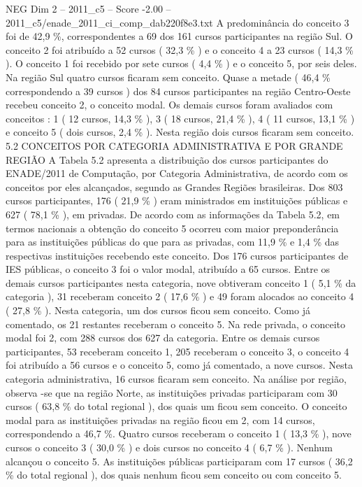 \begin{textsample}{NEG Dim 2 – 2011\_c5 – Score -2.00 – 2011\_c5/enade\_2011\_ci\_comp\_dab220f8e3.txt}
A predominância do conceito 3 foi de 42,9 \%, correspondentes a 69 dos 161 cursos participantes na região Sul.
O conceito 2 foi atribuído a 52 cursos ( 32,3 \% ) e o conceito 4 a 23 cursos ( 14,3 \% ).
O conceito 1 foi recebido por sete cursos ( 4,4 \% ) e o conceito 5, por seis deles.
Na região Sul quatro cursos ficaram sem conceito.
Quase a metade ( 46,4 \% correspondendo a 39 cursos ) dos 84 cursos participantes na região Centro-Oeste recebeu conceito 2, o conceito modal.
Os demais cursos foram avaliados com conceitos : 1 ( 12 cursos, 14,3 \% ), 3 ( 18 cursos, 21,4 \% ), 4 ( 11 cursos, 13,1 \% ) e conceito 5 ( dois cursos, 2,4 \% ).
Nesta região dois cursos ficaram sem conceito. 5.2 CONCEITOS POR CATEGORIA ADMINISTRATIVA E POR GRANDE REGIÃO A Tabela 5.2 apresenta a distribuição dos cursos participantes do ENADE/2011 de Computação, por Categoria Administrativa, de acordo com os conceitos por eles alcançados, segundo as Grandes Regiões brasileiras.
Dos 803 cursos participantes, 176 ( 21,9 \% ) eram ministrados em instituições públicas e 627 ( 78,1 \% ), em privadas.
De acordo com as informações da Tabela 5.2, em termos nacionais a obtenção do conceito 5 ocorreu com maior preponderância para as instituições públicas do que para as privadas, com 11,9 \% e 1,4 \% das respectivas instituições recebendo este conceito.
Dos 176 cursos participantes de IES públicas, o conceito 3 foi o valor modal, atribuído a 65 cursos.
Entre os demais cursos participantes nesta categoria, nove obtiveram conceito 1 ( 5,1 \% da categoria ), 31 receberam conceito 2 ( 17,6 \% ) e 49 foram alocados ao conceito 4 ( 27,8 \% ).
Nesta categoria, um dos cursos ficou sem conceito.
Como já comentado, os 21 restantes receberam o conceito 5.
Na rede privada, o conceito modal foi 2, com 288 cursos dos 627 da categoria.
Entre os demais cursos participantes, 53 receberam conceito 1, 205 receberam o conceito 3, o conceito 4 foi atribuído a 56 cursos e o conceito 5, como já comentado, a nove cursos.
Nesta categoria administrativa, 16 cursos ficaram sem conceito.
Na análise por região, observa -se que na região Norte, as instituições privadas participaram com 30 cursos ( 63,8 \% do total regional ), dos quais um ficou sem conceito.
O conceito modal para as instituições privadas na região ficou em 2, com 14 cursos, correspondendo a 46,7 \%.
Quatro cursos receberam o conceito 1 ( 13,3 \% ), nove cursos o conceito 3 ( 30,0 \% ) e dois cursos no conceito 4 ( 6,7 \% ).
Nenhum alcançou o conceito 5.
As instituições públicas participaram com 17 cursos ( 36,2 \% do total regional ), dos quais nenhum ficou sem conceito ou com conceito 5.

\end{textsample}
